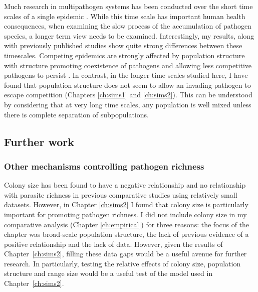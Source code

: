 Much research in multipathogen systems has been conducted over the short time scales of a single epidemic \cite{van2014domination, poletto2013host, poletto2015characterising, funk2010interacting}.
While this time scale has important human health consequences, when examining the slow process of the accumulation of pathogen species, a longer term view needs to be examined.
Interestingly, my results, along with previously published studies show quite strong differences between these timescales. 
Competing epidemics are strongly affected by population structure with structure promoting coexistence of pathogens and allowing less competitive pathogens to persist \cite{poletto2013host, poletto2015characterising}.
In contrast, in the longer time scales studied here, I have found that population structure does not seem to allow an invading pathogen to escape competition (Chapters \ref{ch:sims1} and \ref{ch:sims2}).
This can be understood by considering that at very long time scales, any population is well mixed unless there is complete separation of subpopulations.



\subsection{Further work}

\subsubsection{Other mechanisms controlling pathogen richness}

Colony size has been found to have a negative relationship \cite{gay2014parasite} and no relationship \cite{turmelle2009correlates} with parasite richness in previous comparative studies using relatively small datasets.
However, in Chapter \ref{ch:sims2} I found that colony size is particularly important for promoting pathogen richness.
I did not include colony size in my comparative analysis (Chapter \ref{ch:empirical}) for three reasons: the focus of the chapter was broad-scale population structure, the lack of previous evidence of a positive relationship \cite{gay2014parasite, turmelle2009correlates} and the lack of data.
However, given the results of Chapter~\ref{ch:sims2}, filling these data gaps would be a useful avenue for further research.
In particularly, testing the relative effects of colony size, population structure and range size would be a useful test of the model used in Chapter~\ref{ch:sims2}.

